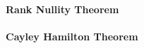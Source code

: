 

\paragraph{Rank Nullity Theorem}


\paragraph{Cayley Hamilton Theorem}










\begin{comment}
Explain what happens to the eigenvalues when we do certain things to a matrix (shifts, etc.)
I have a list of that in some text file. Shifting eigenvalues and manipulating them in other ways
can be important to improve convergence of numerical algrithms

Other possibly relevant matrix types to mention:
https://en.wikipedia.org/wiki/Companion_matrix
https://en.wikipedia.org/wiki/Smith_normal_form



Make a section for "Functions of Matrices" - or soemthing like that. Explain the matrix exponential
and hwo to compute it in practice. See:

Der Putzer-Algorithmus, den kaum jemand kennt, zur Bestimmung der Matrixexponentialfunktion
https://www.youtube.com/watch?v=zUcwmGWh2UA
-Maybe that should go into a matrix calculus chapter
-d/dt e^{t A} = A e^{t A}

....also explain computation via diagonalization

https://en.wikipedia.org/wiki/Matrix_differential_equation


\end{comment}